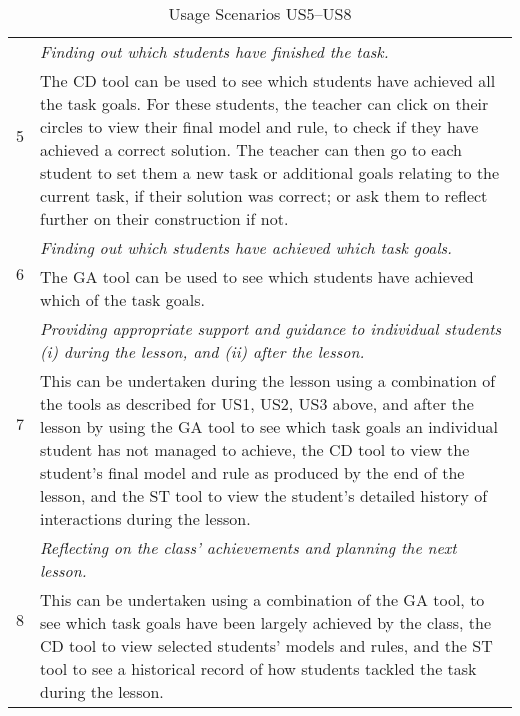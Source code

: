 \begin{table}[htbp]
  \begin{tabular}{|p{0.5cm}|p{12.5cm}|}
  \hline \multirow{2}{*}{5}
  & \emph{Finding out which students have finished the task.} \\
  \cline{2-2}
  & The CD tool can be used to see which students have achieved all
  the task goals. For these students, the teacher can click on their
  circles to view their final model and rule, to check if they have
  achieved a correct solution. The teacher can then go to each student
  to set them a new task or additional goals relating to the current
  task, if their solution was correct; or ask them to reflect further
  on their construction if not. \\
  \hline \multirow{2}{*}{6}
  & \emph{Finding out which students have achieved which task goals.} \\
  \cline{2-2}
  & The GA tool can be used to see which students have achieved which
  of the task goals. \\
  \hline \multirow{2}{*}{7}
  & \emph{Providing appropriate support and guidance to individual
  students (i) during the lesson, and (ii) after the lesson.} \\
  \cline{2-2}
  &  %
     This can be undertaken during
  the lesson using a combination of the tools as described for US1,
  US2, US3 above, and after the lesson by using the GA tool to see
  which task goals an individual student has not managed to achieve,
  the CD tool to view the student's final model and rule as produced
  by the end of the lesson, and the ST tool to view the student's
  detailed history of interactions during the lesson.  \\
  \hline \multirow{2}{*}{8}
  & \emph{Reflecting on the class' achievements and planning the next
  lesson.} \\
  \cline{2-2}
  &  %
     This can be undertaken using a combination of the GA tool, to see which task
  goals have been largely achieved by the class, the CD tool to view
  selected students' models and rules, and the ST tool to see a
  historical record of how students tackled the task during the
  lesson.
   \\
  \hline
  \end{tabular}
  \caption{Usage Scenarios US5--US8}
  \label{tab:UsageScenariosB}
\end{table}
 
